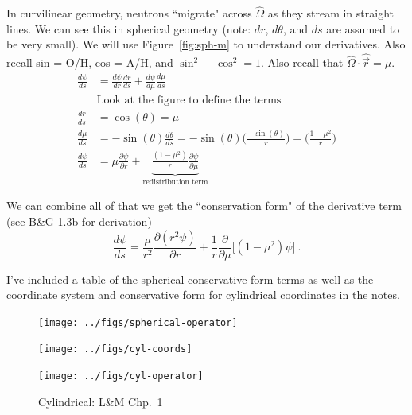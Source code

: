 \documentclass[12pt]{article}
\newcommand{\vOmega}{\ensuremath{\hat{\Omega}}}
\begin{document}
In curvilinear geometry, neutrons ``migrate" across $\vOmega$ as they stream in straight lines. 
We can see this in spherical geometry (note: $dr$, $d\theta$, and $ds$ are assumed to be very small). We will use Figure~\ref{fig:sph-m} to understand our derivatives. Also recall sin = O/H, cos = A/H, and $\sin^2 + \cos^2 = 1$. Also recall that $\vOmega \cdot \hat{\vec{r}} = \mu$.
%
\begin{align*}
\frac{d \psi}{ds} &= \frac{d \psi}{dr} \frac{dr}{ds} + \frac{d\psi}{d\mu} \frac{d\mu}{ds} \\
&\text{Look at the figure to define the terms}\\
\frac{dr}{ds} &= \cos(\theta) = \mu \\
%
\frac{d \mu}{ds} &= -\sin(\theta) \frac{d \theta}{ds} = -\sin(\theta) \biggl(\frac{-\sin(\theta)}{r} \biggr) = \biggl(\frac{1 - \mu^2}{r} \biggr) \\
%
\frac{d\psi}{ds} &= \mu \frac{\partial \psi}{\partial r} + \underbrace{\frac{(1 - \mu^2)}{r}\frac{\partial \psi}{\partial \mu}}_{\text{redistribution term}}
\end{align*}

We can combine all of that we get the ``conservation form" of the derivative term (see B\&G 1.3b for derivation)
\[\frac{d\psi}{ds} = \frac{\mu}{r^2} \frac{\partial(r^2 \psi)}{\partial r} + \frac{1}{r} \frac{\partial}{\partial \mu}\bigl[(1 - \mu^2) \psi \bigr] \:. \]

I've included a table of the spherical conservative form terms as well as the coordinate system and conservative form for cylindrical coordinates in the notes.
%
\begin{figure}[h!] 
    \label{fig:sph-op}
    \begin{center}
    \texttt{[image: ../figs/spherical-operator]}
    \end{center}    
    \begin{center}
    \texttt{[image: ../figs/cyl-coords]}
    \end{center}    
    \label{fig:cyl-coord}
    \begin{center}
    \texttt{[image: ../figs/cyl-operator]}
    \end{center}    
    \caption{Cylindrical: L\&M Chp.\ 1}
\end{figure}
\end{document}
